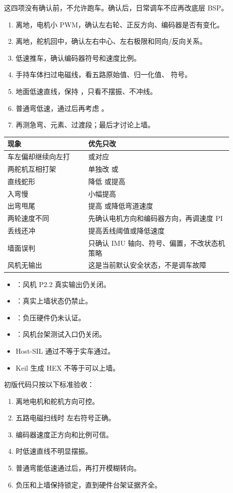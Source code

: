 \documentclass[UTF8,zihao=-4]{ctexart}
\begin{document}
这四项没有确认前，不允许跑车。确认后，日常调车不应再改底层 BSP。


\begin{enumerate}
  \item 离地，电机小 PWM，确认左右轮、正反方向、编码器是否有变化。
  \item 离地，舵机回中，确认左右中心、左右极限和同向/反向关系。
  \item 低速推车，确认编码器符号和速度比例。
  \item 手持车体扫过电磁线，看五路原始值、归一化值、 符号。
  \item 地面低速直线，保持 ，只看不摆振、不冲线。
  \item 普通弯低速，通过后再考虑 。
  \item 再测急弯、元素、过渡段；最后才讨论上墙。
\end{enumerate}


\begin{longtable}{L{0.32\linewidth}L{0.58\linewidth}}
\toprule
现象 & 优先只改 \\
\midrule
车左偏却继续向左打 &  或对应  \\
两舵机互相打架 & 单独改  或  \\
直线蛇形 & 降低  或提高  \\
入弯慢 & 小幅提高  \\
出弯甩尾 & 提高  或降低弯道速度 \\
两轮速度不同 & 先确认电机方向和编码器方向，再调速度 PI \\
丢线还冲 & 提高丢线阈值或降低速度 \\
墙面误判 & 只确认 IMU 轴向、符号、偏置，不改状态机策略 \\
风机无输出 & 这是当前默认安全状态，不是调车故障 \\
\bottomrule
\end{longtable}

\begin{itemize}
  \item {}：风机 P2.2 真实输出仍关闭。
  \item {}：真实上墙状态仍禁止。
  \item {}：负压硬件仍未认证。
  \item {}：风机台架测试入口仍关闭。
  \item Host-SIL 通过不等于实车通过。
  \item Keil 生成 HEX 不等于可以上墙。
\end{itemize}


初版代码只按以下标准验收：

\begin{enumerate}
  \item 离地电机和舵机方向可控。
  \item 五路电磁扫线时  左右符号正确。
  \item 编码器速度正方向和比例可信。
  \item {} 时低速直线不明显摆振。
  \item 普通弯能低速通过后，再打开模糊转向。
  \item 负压和上墙保持锁定，直到硬件台架证据齐全。
\end{enumerate}
\end{document}
